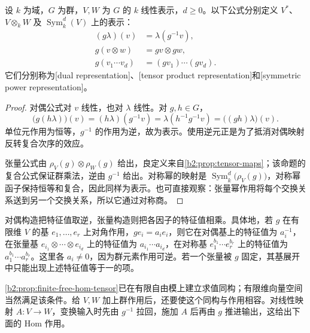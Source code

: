 \begin{proposition}\label{b2:prop:tensor-dual-symmetric-representations}
	设 \(k\) 为域，\(G\) 为群，\(V,W\) 为 \(G\) 的 \(k\) 线性表示，\(d\ge0\)。以下公式分别定义 \(V^*\)、\(V\otimes_kW\) 及 \(\operatorname{Sym}_k^d(V)\) 上的表示：
	\[
		\begin{aligned}
			(g\lambda)(v)&=\lambda(g^{-1}v),\\
			g(v\otimes w)&=gv\otimes gw,\\
			g(v_1\cdots v_d)&=(gv_1)\cdots(gv_d).
		\end{aligned}
	\]
	它们分别称为[dual representation]、[tensor product representation]和[symmetric power representation]。
\end{proposition}
\begin{proof}
	对偶公式对 \(v\) 线性，也对 \(\lambda\) 线性。对 \(g,h\in G\)，
	\[
		\bigl(g(h\lambda)\bigr)(v) =(h\lambda)(g^{-1}v) =\lambda(h^{-1}g^{-1}v) =\bigl((gh)\lambda\bigr)(v).
	\]
	单位元作用为恒等，\(g^{-1}\) 的作用为逆，故为表示。使用逆元正是为了抵消对偶映射反转复合次序的效应。

	张量公式由 \(\rho_V(g)\otimes\rho_W(g)\) 给出，良定义来自\cref{b2:prop:tensor-maps}；该命题的复合公式保证群乘法，逆由 \(g^{-1}\) 给出。对称幂的映射是 \(\operatorname{Sym}_k^d\bigl(\rho_V(g)\bigr)\)，对称幂函子保持恒等和复合，因此同样为表示。也可直接观察：张量幂作用将每个交换关系送到另一个交换关系，所以它通过对称商。
\end{proof}

对偶构造把特征值取逆，张量构造则把各因子的特征值相乘。具体地，若 \(g\) 在有限维 \(V\) 的基 \(e_1,\ldots,e_r\) 上对角作用，\(ge_i=a_i e_i\)，则它在对偶基上的特征值为 \(a_i^{-1}\)，在张量基 \(e_{i_1}\otimes\cdots\otimes e_{i_d}\) 上的特征值为 \(a_{i_1}\cdots a_{i_d}\)，在对称基 \(e_1^{b_1}\cdots e_r^{b_r}\) 上的特征值为 \(a_1^{b_1}\cdots a_r^{b_r}\)。这里各 \(a_i\ne0\)，因为群元素作用可逆。若一个张量被 \(g\) 固定，其基展开中只能出现上述特征值等于一的项。

\ProseParagraphBreak
\cref{b2:prop:finite-free-hom-tensor}已在有限自由模上建立求值同构；有限维向量空间当然满足该条件。给 \(V,W\) 加上群作用后，还要使这个同构与作用相容。对线性映射 \(A:V\to W\)，变换输入时先由 \(g^{-1}\) 拉回，施加 \(A\) 后再由 \(g\) 推进输出，这给出下面的 Hom 作用。

